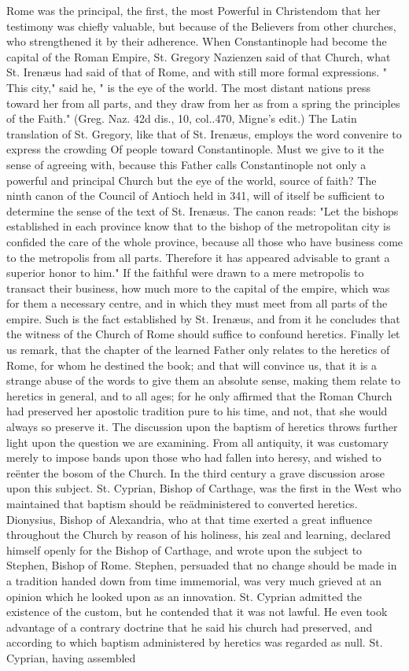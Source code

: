 Rome was the principal, the first, the most Powerful in Christendom that her testimony was chiefly valuable, but because of the Believers from other churches, who strengthened it by their adherence. When Constantinople had become the capital of the Roman Empire, St. Gregory Nazienzen said of that Church, what St. Irenæus had said of that of Rome, and with still more formal expressions. " This city," said he, " is the eye of the world. The most distant nations press toward her from all parts, and they draw from her as from a spring the principles of the Faith." (Greg. Naz. 42d dis., 10, col..470, Migne's edit.) The Latin translation of St. Gregory, like that of St. Irenæus, employs the word convenire to express the crowding Of people toward Constantinople. Must we give to it the sense of agreeing with, because this Father calls Constantinople not only a powerful and principal Church but the eye of the world, source of faith? The ninth canon of the Council of Antioch held in 341, will of itself be sufficient to determine the sense of the text of St. Irenæus. The canon reads: "Let the bishops established in each province know that to the bishop of the metropolitan city is confided the care of the whole province, because all those who have business come to the metropolis from all parts. Therefore it has appeared advisable to grant a superior honor to him." If the faithful were drawn to a mere metropolis to transact their business, how much more to the capital of the empire, which was for them a necessary centre, and in which they must meet from all parts of the empire. Such is the fact established by St. Irenæus, and from it he concludes that the witness of the Church of Rome should suffice to confound heretics. Finally let us remark, that the chapter of the learned Father only relates to the heretics of Rome, for whom he destined the book; and that will convince us, that it is a strange abuse of the words to give them an absolute sense, making them relate to heretics in general, and to all ages; for he only affirmed that the Roman Church had preserved her apostolic tradition pure to his time, and not, that she would always so preserve it. The discussion upon the baptism of heretics throws further light upon the question we are examining. From all antiquity, it was customary merely to impose bands upon those who had fallen into heresy, and wished to reënter the bosom of the Church. In the third century a grave discussion arose upon this subject. St. Cyprian, Bishop of Carthage, was the first in the West who maintained that baptism should be reädministered to converted heretics. Dionysius, Bishop of Alexandria, who at that time exerted a great influence throughout the Church by reason of his holiness, his zeal and learning, declared himself openly for the Bishop of Carthage, and wrote upon the subject to Stephen, Bishop of Rome. Stephen, persuaded that no change should be made in a tradition handed down from time immemorial, was very much grieved at an opinion which he looked upon as an innovation. St. Cyprian admitted the existence of the custom, but he contended that it was not lawful. He even took advantage of a contrary doctrine that he said his church had preserved, and according to which baptism administered by heretics was regarded as null. St. Cyprian, having assembled 
